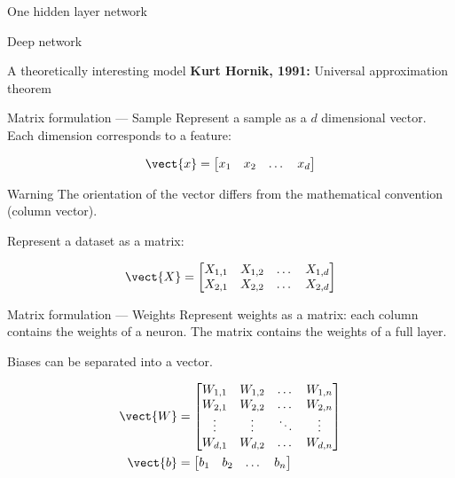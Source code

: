 \begin{frame}{One hidden layer network}
  \centering
\end{frame}

\begin{frame}{Deep network}
  \centering
\end{frame}

\begin{frame}{A theoretically interesting model}
  \textbf{Kurt Hornik, 1991:} Universal approximation theorem
\end{frame}

\begin{frame}{Matrix formulation --- Sample}
  Represent a sample as a $d$ dimensional vector. Each dimension corresponds to a feature:

  \[
    \vect{x} = \begin{bmatrix}
      x_1 & x_2 & \dots & x_d
    \end{bmatrix}
  \]

  \begin{alertblock}{Warning}
    The orientation of the  vector differs from the mathematical convention (column vector).
  \end{alertblock}

  Represent a dataset as a matrix:

  \[
    \vect{X} = \begin{bmatrix}
      X_{1,1} & X_{1,2} & \dots & X_{1,d} \\
      X_{2,1} & X_{2,2} & \dots & X_{2,d}
    \end{bmatrix}
  \]

\end{frame}

\begin{frame}{Matrix formulation --- Weights}
  Represent weights as a matrix: each column contains the weights of a neuron.
  The matrix contains the weights of a full layer.

  Biases can be separated into a vector.

  \begin{align*}
    \vect{W} & = \begin{bmatrix}
      W_{1,1} & W_{1,2} & \dots  & W_{1,n} \\
      W_{2,1} & W_{2,2} & \dots  & W_{2,n} \\
      \vdots & \vdots & \ddots & \vdots \\
      W_{d,1} & W_{d,2} & \dots  & W_{d,n}
    \end{bmatrix} \\
    \vect{b} & = \begin{bmatrix}
      b_1 & b_2 & \dots & b_n
    \end{bmatrix}
  \end{align*}
\end{frame}

